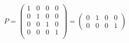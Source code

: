 $$
P=
\left(
\begin{array}{rrrr}
1   & 0 & 0  & 0  \\
0  &  1 & 0 & 0 \\
0  &  0 & 1 & 0 \\
0  & 0 & 0 & 1 \\
\end{array}
\right)
=
\left(
\begin{array}{rrrr}
0   & 1 & 0  & 0  \\
0  &  0 & 0 & 1
\end{array}
\right)
$$
